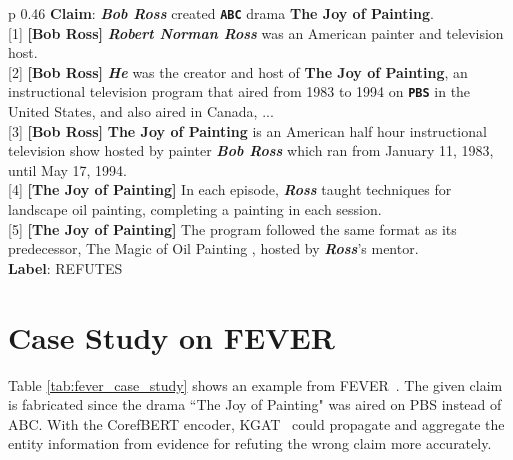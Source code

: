 \documentclass[11pt,a4paper]{article}
\begin{document}
\begin{table}[!t]
\begin{center}

\begin{tabular}{p {0.46\textwidth}}
\toprule
\textbf{Claim}: {\color{blue}\bf \textit{Bob Ross}} created {\color{rel} \bf \texttt{ABC}} drama {\color{red} \bf The Joy of Painting}. \\
\midrule
\vspace{-0.7em}
{\color{olive} [1]  \bf  {[Bob Ross]}}
{\color{blue}\bf \textit{Robert Norman Ross}}  was an American painter and television host. \\
\vspace{-0.7em}
{\color{olive} [2]  \bf  [Bob Ross]}
{\color{blue}\bf \textit{He}} was the creator and host of {\color{red} \bf The Joy of Painting}, an instructional television program that aired from 1983 to 1994 on {\color{rel} \bf \texttt{PBS}} in the United States, and also aired in Canada, ... \\
\vspace{-0.7em}
{\color{olive} [3]  \bf  {[Bob Ross]} }
  {\color{red} \bf The Joy of Painting}  is an American half hour instructional television show hosted by painter {\color{blue}\bf \textit{Bob Ross}}  which ran from January 11, 1983, until May 17, 1994. \\
\vspace{-0.7em}
{\color{olive} [4] \bf  [The Joy of Painting]}
 In each episode, {\color{blue}\bf \textit{Ross}}   taught techniques for landscape oil painting, completing a painting in each session. \\
\vspace{-0.7em}
{\color{olive} [5]  \bf  [The Joy of Painting]}
 The program followed the same format as its predecessor, The Magic of Oil Painting , hosted by {\color{blue}\bf \textit{Ross}}'s mentor. \\ 
\midrule
\textbf{Label}: REFUTES \\
\bottomrule
\end{tabular}
\end{center}
\caption{An example from FEVER~\citep{Fever}. Five pieces of evidence from article {\color{olive}  \bf  [Bob Ross]} and  {\color{olive}  \bf  [The Joy of Painting]} are retrieved by the retriever. }
\label{tab:fever_case_study}

\end{table}


\section{Case Study on FEVER}
Table \ref{tab:fever_case_study} shows an example from FEVER~\citep{Fever}. The given claim is fabricated since the drama ``The Joy of Painting" was aired on PBS instead of  ABC. With the CorefBERT encoder, KGAT~\citep{Zhenghao} could propagate and aggregate the entity information from evidence for refuting the wrong claim more accurately. 
\end{document}
